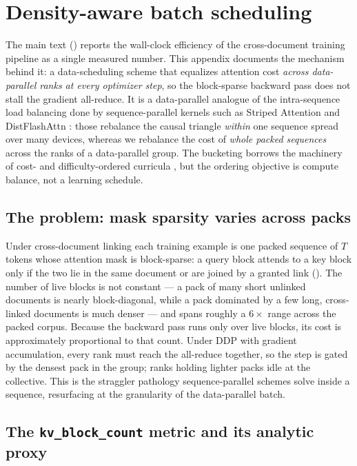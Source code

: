 \section{Density-aware batch scheduling}
\label{app:density}

The main text () reports the wall-clock efficiency of the
cross-document training pipeline as a single measured number. This appendix
documents the mechanism behind it: a data-scheduling scheme that equalizes
attention cost \emph{across data-parallel ranks at every optimizer step}, so the
block-sparse backward pass does not stall the gradient all-reduce. It is a
data-parallel analogue of the intra-sequence load balancing done by
sequence-parallel kernels such as Striped Attention \citep{brandon2023striped}
and DistFlashAttn \citep{li2023distflashattn}: those rebalance the causal
triangle \emph{within} one sequence spread over many devices, whereas we
rebalance the cost of \emph{whole packed sequences} across the ranks of a
data-parallel group. The bucketing borrows the machinery of cost- and
difficulty-ordered curricula
\citep{pouransari2024datasetdecomposition,bengio2009curriculum,kocmi2017curriculum},
but the ordering objective is compute balance, not a learning schedule.

\subsection{The problem: mask sparsity varies across packs}

Under cross-document linking each training example is one packed sequence of $T$
tokens whose attention mask is block-sparse: a query block attends to a key
block only if the two lie in the same document or are joined by a granted link
(). The number of live blocks is not constant --- a pack of
many short unlinked documents is nearly block-diagonal, while a pack dominated by
a few long, cross-linked documents is much denser --- and spans roughly a
$6\times$ range across the packed corpus. Because the backward pass runs only
over live blocks, its cost is approximately proportional to that count. Under DDP
with gradient accumulation, every rank must reach the all-reduce together, so the
step is gated by the densest pack in the group; ranks holding lighter packs idle
at the collective. This is the straggler pathology sequence-parallel schemes
solve inside a sequence, resurfacing at the granularity of the data-parallel
batch.

\subsection{The \texttt{kv\_block\_count} metric and its analytic proxy}


